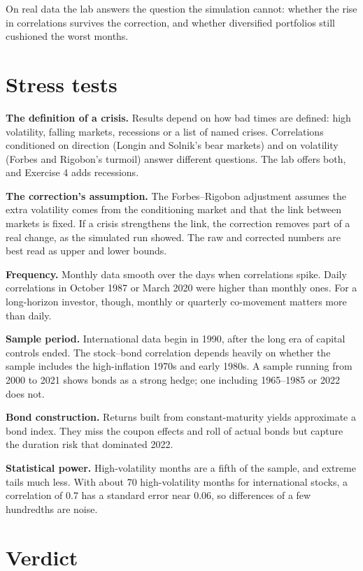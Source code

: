 On real data the lab answers the question the simulation cannot: whether the rise in correlations survives the correction, and whether diversified portfolios still cushioned the worst months.

\section{Stress tests}
\label{sec:13-stress}

\textbf{The definition of a crisis.} Results depend on how bad times are defined: high volatility, falling markets, recessions or a list of named crises. Correlations conditioned on direction (Longin and Solnik's bear markets) and on volatility (Forbes and Rigobon's turmoil) answer different questions. The lab offers both, and Exercise 4 adds recessions.

\textbf{The correction's assumption.} The Forbes--Rigobon adjustment assumes the extra volatility comes from the conditioning market and that the link between markets is fixed. If a crisis strengthens the link, the correction removes part of a real change, as the simulated run showed. The raw and corrected numbers are best read as upper and lower bounds.

\textbf{Frequency.} Monthly data smooth over the days when correlations spike. Daily correlations in October 1987 or March 2020 were higher than monthly ones. For a long-horizon investor, though, monthly or quarterly co-movement matters more than daily.

\textbf{Sample period.} International data begin in 1990, after the long era of capital controls ended. The stock--bond correlation depends heavily on whether the sample includes the high-inflation 1970s and early 1980s. A sample running from 2000 to 2021 shows bonds as a strong hedge; one including 1965--1985 or 2022 does not.

\textbf{Bond construction.} Returns built from constant-maturity yields approximate a bond index. They miss the coupon effects and roll of actual bonds but capture the duration risk that dominated 2022.

\textbf{Statistical power.} High-volatility months are a fifth of the sample, and extreme tails much less. With about 70 high-volatility months for international stocks, a correlation of 0.7 has a standard error near 0.06, so differences of a few hundredths are noise.

\section{Verdict}
\label{sec:13-verdict}

